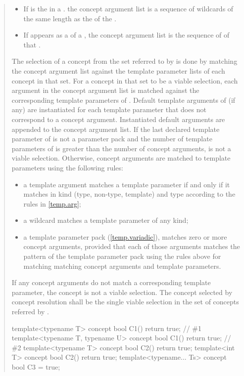 \begin{quote}
\begin{addedblock}
\begin{itemize}
\item If  is the  in a
. the concept argument list is a sequence 
of wildcards of the same length as the  of
the .

\item If  appears as a  of a
, the concept argument list is the sequence of
 of that .
\end{itemize}

\pnum
The selection of a concept from the set referred to by  is done 
by matching the concept argument list against the template parameter lists of 
each concept in that set.
% 
For a concept  in that set to be a viable selection, each 
argument in the concept argument list is matched against the corresponding 
template parameters of .
% 
Default template arguments of  (if any) are instantiated for each 
template parameter that does not correspond to a concept argument. Instantiated
default arguments are appended to the concept argument list.
% 
If the last declared template parameter of  is not a parameter pack
and the number of template parameters of  is greater than the
number of concept arguments,  is not a viable selection.
% 
Otherwise, concept arguments are matched to template parameters using the 
following rules:
% 
\begin{itemize}
\item a template argument matches a template parameter if and only if
it matches in kind (type, non-type, template) and type according to the
rules in \ref{temp.arg};

\item a wildcard matches a template parameter of any kind;

\item a template parameter pack (\ref{temp.variadic}), matches zero or more 
concept arguments, provided that each of those arguments matches the pattern 
of the template parameter pack using the rules above for matching matching 
concept arguments and template parameters.
\end{itemize}
% 
If any concept arguments do not match a corresponding template parameter,
the concept  is not a viable selection.
% 
The concept selected by concept resolution shall be the single viable selection
in the set of concepts referred by .
% 
\enterexample
\begin{codeblock}
template<typename T> concept bool C1() { return true; }             // \#1
template<typename T, typename U> concept bool C1() { return true; } // \#2
template<typename T> concept bool C2() { return true; }
template<int T> concept bool C2() { return true; }
template<typename... Ts> concept bool C3 = true;


\end{codeblock}
\end{addedblock}
\end{quote}
